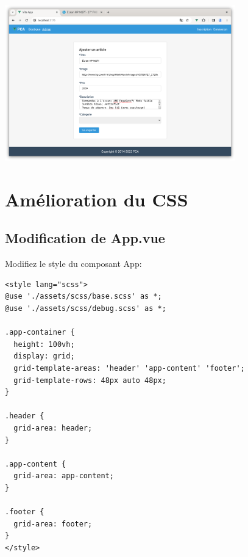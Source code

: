 \begin{center}
\includegraphics[width=10cm]{images/image37.png}
\end{center}


\section{Amélioration du CSS}
\subsection{Modification de {\color{monOrange}App.vue}}
Modifiez le style du composant {\color{monOrange}App}:
\begin{verbatim}
<style lang="scss">
@use './assets/scss/base.scss' as *;
@use './assets/scss/debug.scss' as *;

.app-container {
  height: 100vh;
  display: grid;
  grid-template-areas: 'header' 'app-content' 'footer';
  grid-template-rows: 48px auto 48px;
}

.header {
  grid-area: header;
}

.app-content {
  grid-area: app-content;
}

.footer {
  grid-area: footer;
}
</style>
\end{verbatim}
